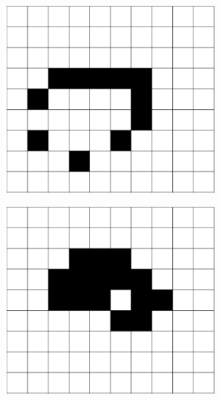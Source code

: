 \documentclass[12pt]{article}
\numberwithin{figure}{section} %
\begin{document}
\begin{figure}[H]
\begin{subfigure}{0.18\textwidth}
     		\includegraphics[width=\linewidth]{Section1/6.0}
     		\subcaption{}
   	\end{subfigure}
    	\begin{subfigure}{0.18\textwidth}
     		\centering
     		\includegraphics[width=\linewidth]{Section1/6.1}
     		\subcaption{}
   	\end{subfigure}
     	\begin{subfigure}{0.18\textwidth}

\end{subfigure}
\end{figure}
\end{document}
